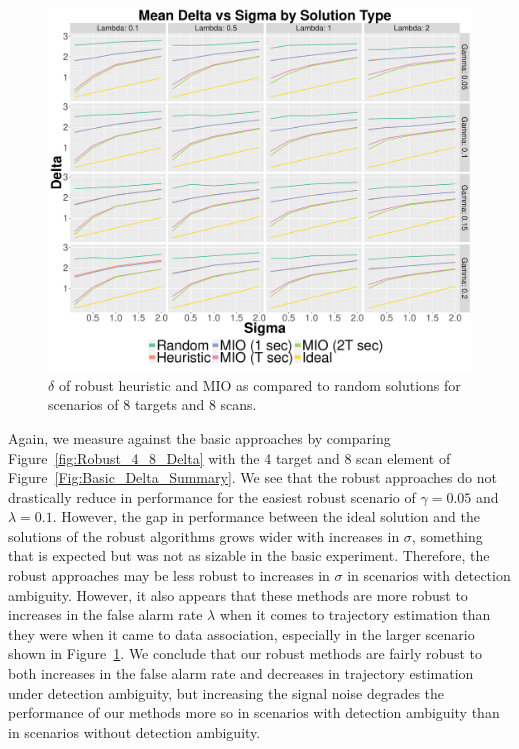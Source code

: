 \begin{figure}[ht]
  \centering
  \includegraphics[width=\columnwidth]{../Figures/8_8_Delta}
  \caption{$\delta$ of robust heuristic and MIO as compared to random solutions for scenarios of 8 targets and 8 scans.}
  \label{fig:Robust_8_8_Delta}
\end{figure}

Again, we measure against the basic approaches by comparing Figure~\ref{fig:Robust_4_8_Delta} with the 4 target and 8 scan element of Figure~\ref{Fig:Basic_Delta_Summary}. We see that the robust approaches do not drastically reduce in performance for the easiest robust scenario of $\gamma = 0.05$ and $\lambda = 0.1$. However, the gap in performance between the ideal solution and the solutions of the robust algorithms grows wider with increases in $\sigma$, something that is expected but was not as sizable in the basic experiment. Therefore, the robust approaches may be less robust to increases in $\sigma$ in scenarios with detection ambiguity. However, it also appears that these methods are more robust to increases in the false alarm rate $\lambda$ when it comes to trajectory estimation than they were when it came to data association, especially in the larger scenario shown in Figure~\ref{fig:Robust_8_8_Delta}. We conclude that our robust methods are fairly robust to both increases in the false alarm rate and decreases in trajectory estimation under detection ambiguity, but increasing the signal noise degrades the performance of our methods more so in scenarios with detection ambiguity than in scenarios without detection ambiguity.